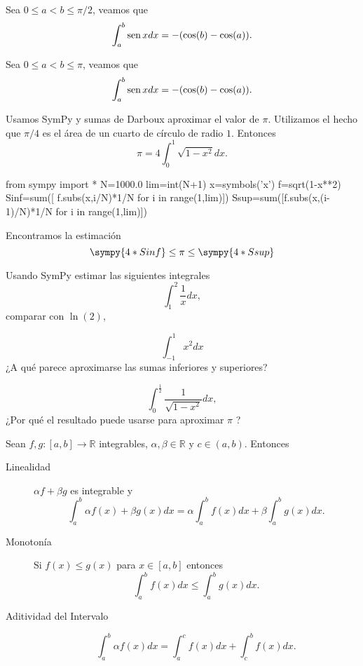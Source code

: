 \begin{ejemplo}{} Sea $0\leq a<b\leq \pi/2$, veamos que
\[
 \int_a^b \operatorname{sen} x dx=-(\cos(b)-\cos(a)).
\]
\end{ejemplo}



\begin{ejercicio}{} Sea $0\leq a<b\leq \pi$, veamos que
\[
 \int_a^b \operatorname{sen} x dx=-(\cos(b)-\cos(a)).
\]
\end{ejercicio}


\begin{ejemplo}{} Usamos SymPy y sumas de Darboux aproximar el valor de $\pi$. Utilizamos el hecho que $\pi/4$ es el área de un cuarto de círculo de radio $1$. Entonces 
$$\pi=4\int_0^1\sqrt{1-x^2}dx.$$

\begin{sympyblock}
from sympy import *
N=1000.0
lim=int(N+1)
x=symbols('x')
f=sqrt(1-x**2)
Sinf=sum([ f.subs(x,i/N)*1/N for i in range(1,lim)])
Ssup=sum([f.subs(x,(i-1)/N)*1/N for i in range(1,lim)])
\end{sympyblock}
Encontramos la estimación
\[\sympy{4*Sinf}\leq \pi \leq \sympy{4*Ssup}\]
\end{ejemplo}

\begin{ejercicio}{} Usando SymPy estimar las siguientes integrales 
$$\int_1^2\frac{1}{x}dx,$$
 comparar con $\ln(2)$,

$$\int_{-1}^{1}x^2dx$$
¿A qué parece aproximarse las sumas inferiores y superiores?

$$\int_0^{\frac{1}{2}}\frac{1}{\sqrt{1-x^2}}dx,$$
¿Por qué el resultado puede usarse para aproximar $\pi$ ?

 
\end{ejercicio}




\begin{teorema}{} Sean $f,g:[a,b]\to\mathbb{R}$ integrables, $\alpha,\beta\in\mathbb{R}$ y $c\in (a,b)$. Entonces
\begin{description}
 \item[Linealidad] $\alpha f+\beta g$ es integrable y 
 \[
  \int_a^b\alpha f(x)+\beta g(x)dx=\alpha \int_a^bf(x)dx+\beta\int_a^b g(x)dx.
 \]
 \item[Monotonía] Si $f(x)\leq g(x)$  para $x\in [a,b]$ entonces 
 \[
  \int_a^b f(x)dx\leq \int_a^b g(x)dx.
 \]
 \item[Aditividad del Intervalo]  \[
  \int_a^b\alpha f(x)dx= \int_a^cf(x)dx+\int_c^b f(x)dx.
 \]
\end{description}


\end{teorema}

